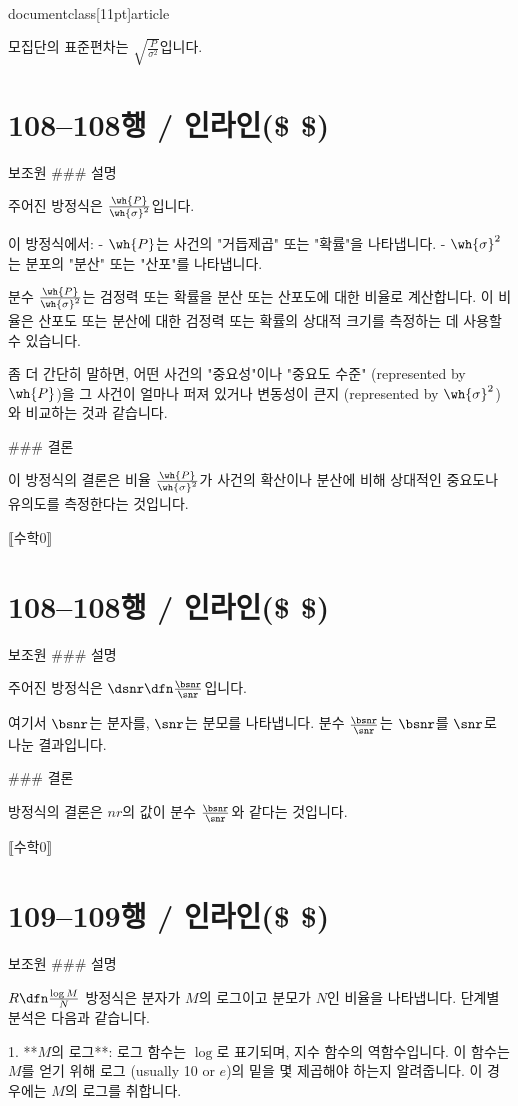 \\documentclass[11pt]{article}
\begin{document}
모집단의 표준편차는 \(\boxed{\sqrt{\frac{P}{\sigma^2}}}\)입니다.

\section*{108–108행 / 인라인(\$ \$) }
보조원
### 설명

주어진 방정식은 \(\frac{\wh{P}}{\wh{\sigma}^2}\)입니다.

이 방정식에서:
- \(\wh{P}\)는 사건의 "거듭제곱" 또는 "확률"을 나타냅니다.
- \(\wh{\sigma}^2\)는 분포의 "분산" 또는 "산포"를 나타냅니다.

분수 \(\frac{\wh{P}}{\wh{\sigma}^2}\)는 검정력 또는 확률을 분산 또는 산포도에 대한 비율로 계산합니다. 이 비율은 산포도 또는 분산에 대한 검정력 또는 확률의 상대적 크기를 측정하는 데 사용할 수 있습니다.

좀 더 간단히 말하면, 어떤 사건의 "중요성"이나 "중요도 수준" (represented by \(\wh{P}\))을 그 사건이 얼마나 퍼져 있거나 변동성이 큰지 (represented by \(\wh{\sigma}^2\))와 비교하는 것과 같습니다.

### 결론

이 방정식의 결론은 비율 \(\frac{\wh{P}}{\wh{\sigma}^2}\)가 사건의 확산이나 분산에 비해 상대적인 중요도나 유의도를 측정한다는 것입니다.

⟦수학0⟧

\section*{108–108행 / 인라인(\$ \$) }
보조원
### 설명

주어진 방정식은 \(\dsnr\dfn\frac{\bsnr}{\snr}\)입니다.

여기서 \(\bsnr\)는 분자를, \(\snr\)는 분모를 나타냅니다. 분수 \(\frac{\bsnr}{\snr}\)는 \(\bsnr\)를 \(\snr\)로 나눈 결과입니다.

### 결론

방정식의 결론은 \(nr\)의 값이 분수 \(\frac{\bsnr}{\snr}\)와 같다는 것입니다.

⟦수학0⟧

\section*{109–109행 / 인라인(\$ \$) }
보조원
### 설명

\( R \dfn \frac{\log{M}}{N} \) 방정식은 분자가 \( M \)의 로그이고 분모가 \( N \)인 비율을 나타냅니다. 단계별 분석은 다음과 같습니다.

1. **\( M \)의 로그**: ​​로그 함수는 \( \log \)로 표기되며, 지수 함수의 역함수입니다. 이 함수는 \( M \)를 얻기 위해 로그 (usually 10 or \( e \))의 밑을 몇 제곱해야 하는지 알려줍니다. 이 경우에는 \( M \)의 로그를 취합니다.
\end{document}
